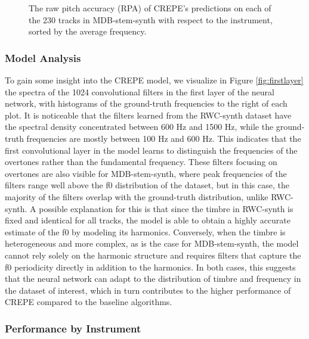 \begin{figure}
\begin{minipage}{\columnwidth}
\begin{center}
		\end{center}
		\vspace{-10pt}
		\caption{
			The raw pitch accuracy (RPA) of CREPE's predictions on each of the 230 tracks in MDB-stem-synth with respect to the instrument, sorted by the average frequency.
		}
		\label{fig:per-track}
	\end{minipage}
\end{figure}


\subsubsection{Model Analysis}

To gain some insight into the CREPE model, we visualize in Figure \ref{fig:firstlayer} the spectra of the 1024 convolutional filters in the first layer of the neural network, with histograms of the ground-truth frequencies to the right of each plot.
It is noticeable that the filters learned from the RWC-synth dataset have the spectral density concentrated between 600 Hz and 1500 Hz, while the ground-truth frequencies are mostly between 100 Hz and 600 Hz.
This indicates that the first convolutional layer in the model learns to distinguish the frequencies of the overtones rather than the fundamental frequency.
These filters focusing on overtones are also visible for MDB-stem-synth, where peak frequencies of the filters range well above the f0 distribution of the dataset, but in this case, the majority of the filters overlap with the ground-truth distribution, unlike RWC-synth.
A possible explanation for this is that since the timbre in RWC-synth is fixed and identical for all tracks, the model is able to obtain a highly accurate estimate of the f0 by modeling its harmonics.
Conversely, when the timbre is heterogeneous and more complex, as is the case for MDB-stem-synth, the model cannot rely solely on the harmonic structure and requires filters that capture the f0 periodicity directly in addition to the harmonics.
In both cases, this suggests that the neural network can adapt to the distribution of timbre and frequency in the dataset of interest, which in turn contributes to the higher performance of CREPE compared to the baseline algorithms.

\subsubsection{Performance by Instrument}

